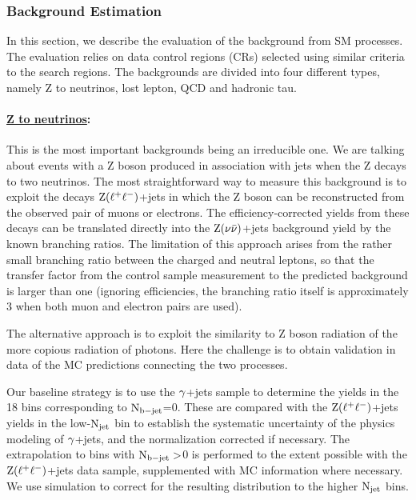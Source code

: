 \subsubsection{Background Estimation }
In this section, we describe the evaluation of the background from SM processes. The evaluation
relies on data control regions (CRs) selected using similar criteria to the search regions. The backgrounds are 
divided into four different types, namely Z to neutrinos, lost lepton, QCD and hadronic tau.

\paragraph{\underline {Z to neutrinos}: }


This is the most important backgrounds being an irreducible one. We are talking about events with a Z boson produced in association with jets when the Z decays to two neutrinos. The most straightforward way to measure this background is
to exploit the decays $\rm Z(\ell^{+} \ell^{-})$+jets in which the Z boson can be
reconstructed from the observed pair of muons or electrons.  The
efficiency-corrected yields from these decays can be translated
directly into the $\rm Z(\nu \bar{\nu})$+jets background yield by the known branching
ratios.  The limitation of this approach arises from the rather small
branching ratio between the charged and neutral leptons, so that the
transfer factor from the control sample measurement to the predicted
background is larger than one (ignoring efficiencies, the
branching ratio itself is approximately 3 when both muon and electron
pairs are used). 

The alternative approach is to exploit the similarity to Z boson
radiation of the more copious radiation of photons.  Here the
challenge is to obtain validation in data of the MC predictions
connecting the two processes.

Our baseline strategy is to use the $\rm \gamma$+jets sample to determine the
yields in the 18 bins corresponding to $\rm N_{b-jet}$=0.  These are
compared with the $\rm Z(\ell^{+} \ell^{-})$+jets yields in the low-$\rm N_{jet}$
bin to establish the systematic uncertainty of the physics modeling of
$\rm \gamma$+jets, and the normalization corrected if necessary.  
The extrapolation to bins with $\rm N_{b-jet}>$0 is performed to
the extent possible with the $\rm Z(\ell^{+} \ell^{-})$+jets data sample, supplemented with MC
information where necessary. We use simulation to correct for the
resulting distribution to the higher $\rm N_{jet}$ bins.

